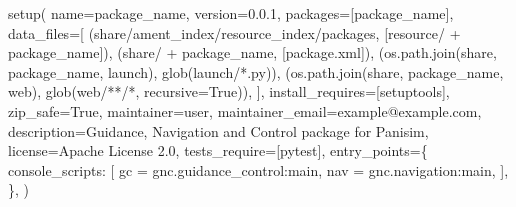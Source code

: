 \documentclass[
  letterpaper,
  DIV=11,
  numbers=noendperiod]{scrreprt}
\newenvironment{Shaded}{\begin{snugshade}}{\end{snugshade}}
\newcommand{\NormalTok}[1]{\textcolor[rgb]{0.00,0.23,0.31}{#1}}
\newcommand{\OperatorTok}[1]{\textcolor[rgb]{0.37,0.37,0.37}{#1}}
\newcommand{\StringTok}[1]{\textcolor[rgb]{0.13,0.47,0.30}{#1}}
\newcommand{\VariableTok}[1]{\textcolor[rgb]{0.07,0.07,0.07}{#1}}
\begin{document}
\begin{Shaded}
\begin{Highlighting}[]
\NormalTok{setup(}
\NormalTok{    name}\OperatorTok{=}\NormalTok{package\_name,}
\NormalTok{    version}\OperatorTok{=}\StringTok{\textquotesingle{}0.0.1\textquotesingle{}}\NormalTok{,}
\NormalTok{    packages}\OperatorTok{=}\NormalTok{[package\_name],}
\NormalTok{    data\_files}\OperatorTok{=}\NormalTok{[}
\NormalTok{        (}\StringTok{\textquotesingle{}share/ament\_index/resource\_index/packages\textquotesingle{}}\NormalTok{,}
\NormalTok{            [}\StringTok{\textquotesingle{}resource/\textquotesingle{}} \OperatorTok{+}\NormalTok{ package\_name]),}
\NormalTok{        (}\StringTok{\textquotesingle{}share/\textquotesingle{}} \OperatorTok{+}\NormalTok{ package\_name, [}\StringTok{\textquotesingle{}package.xml\textquotesingle{}}\NormalTok{]),}
\NormalTok{        (os.path.join(}\StringTok{\textquotesingle{}share\textquotesingle{}}\NormalTok{, package\_name, }\StringTok{\textquotesingle{}launch\textquotesingle{}}\NormalTok{), glob(}\StringTok{\textquotesingle{}launch/*.py\textquotesingle{}}\NormalTok{)),}
\NormalTok{        (os.path.join(}\StringTok{\textquotesingle{}share\textquotesingle{}}\NormalTok{, package\_name, }\StringTok{\textquotesingle{}web\textquotesingle{}}\NormalTok{), glob(}\StringTok{\textquotesingle{}web/**/*\textquotesingle{}}\NormalTok{, recursive}\OperatorTok{=}\VariableTok{True}\NormalTok{)),}
\NormalTok{    ],}
\NormalTok{    install\_requires}\OperatorTok{=}\NormalTok{[}\StringTok{\textquotesingle{}setuptools\textquotesingle{}}\NormalTok{],}
\NormalTok{    zip\_safe}\OperatorTok{=}\VariableTok{True}\NormalTok{,}
\NormalTok{    maintainer}\OperatorTok{=}\StringTok{\textquotesingle{}user\textquotesingle{}}\NormalTok{,}
\NormalTok{    maintainer\_email}\OperatorTok{=}\StringTok{\textquotesingle{}example@example.com\textquotesingle{}}\NormalTok{,}
\NormalTok{    description}\OperatorTok{=}\StringTok{\textquotesingle{}Guidance, Navigation and Control package for Panisim\textquotesingle{}}\NormalTok{,}
\NormalTok{    license}\OperatorTok{=}\StringTok{\textquotesingle{}Apache License 2.0\textquotesingle{}}\NormalTok{,}
\NormalTok{    tests\_require}\OperatorTok{=}\NormalTok{[}\StringTok{\textquotesingle{}pytest\textquotesingle{}}\NormalTok{],}
\NormalTok{    entry\_points}\OperatorTok{=}\NormalTok{\{}
        \StringTok{\textquotesingle{}console\_scripts\textquotesingle{}}\NormalTok{: [}
            \StringTok{\textquotesingle{}gc = gnc.guidance\_control:main\textquotesingle{}}\NormalTok{,}
            \StringTok{\textquotesingle{}nav = gnc.navigation:main\textquotesingle{}}\NormalTok{,}
\NormalTok{        ],}
\NormalTok{    \},}
\NormalTok{)}
\end{Highlighting}
\end{Shaded}
\end{document}
